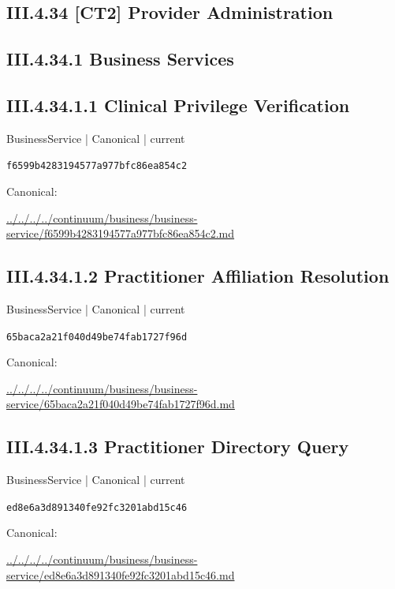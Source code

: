 \documentclass[10pt,a4paper]{article}
\begin{document}
\subsection*{III.4.34 [CT2] Provider Administration}
\subsection*{III.4.34.1 Business Services}
\subsection*{III.4.34.1.1 Clinical Privilege Verification}
{\small BusinessService | Canonical | current}\par
\texttt{f6599b4283194577a977bfc86ea854c2}\par
Canonical: \par
{\footnotesize\url{../../../../continuum/business/business-service/f6599b4283194577a977bfc86ea854c2.md}}\par
\subsection*{III.4.34.1.2 Practitioner Affiliation Resolution}
{\small BusinessService | Canonical | current}\par
\texttt{65baca2a21f040d49be74fab1727f96d}\par
Canonical: \par
{\footnotesize\url{../../../../continuum/business/business-service/65baca2a21f040d49be74fab1727f96d.md}}\par
\subsection*{III.4.34.1.3 Practitioner Directory Query}
{\small BusinessService | Canonical | current}\par
\texttt{ed8e6a3d891340fe92fc3201abd15c46}\par
Canonical: \par
{\footnotesize\url{../../../../continuum/business/business-service/ed8e6a3d891340fe92fc3201abd15c46.md}}\par
\end{document}
